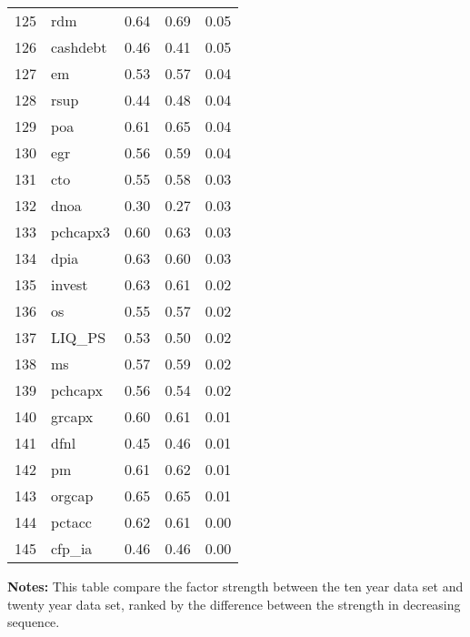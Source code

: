 \documentclass[12pt]{article}
\begin{document}
\begin{footnotesize}
\begin{longtable}{rl|c|c|c}
  125 & rdm & 0.64 & 0.69 & 0.05 \\ 
  126 & cashdebt & 0.46 & 0.41 & 0.05 \\ 
  127 & em & 0.53 & 0.57 & 0.04 \\ 
  128 & rsup & 0.44 & 0.48 & 0.04 \\ 
  129 & poa & 0.61 & 0.65 & 0.04 \\ 
  130 & egr & 0.56 & 0.59 & 0.04 \\ 
  131 & cto & 0.55 & 0.58 & 0.03 \\ 
  132 & dnoa & 0.30 & 0.27 & 0.03 \\ 
  133 & pchcapx3 & 0.60 & 0.63 & 0.03 \\ 
  134 & dpia & 0.63 & 0.60 & 0.03 \\ 
  135 & invest & 0.63 & 0.61 & 0.02 \\ 
  136 & os & 0.55 & 0.57 & 0.02 \\ 
  137 & LIQ\_PS & 0.53 & 0.50 & 0.02 \\ 
  138 & ms & 0.57 & 0.59 & 0.02 \\ 
  139 & pchcapx & 0.56 & 0.54 & 0.02 \\ 
  140 & grcapx & 0.60 & 0.61 & 0.01 \\ 
  141 & dfnl & 0.45 & 0.46 & 0.01 \\ 
  142 & pm & 0.61 & 0.62 & 0.01 \\ 
  143 & orgcap & 0.65 & 0.65 & 0.01 \\ 
  144 & pctacc & 0.62 & 0.61 & 0.00 \\ 
  145 & cfp\_ia & 0.46 & 0.46 & 0.00 \\ 
   \hline
		
	\end{longtable}
{\bf Notes:}
This table compare the factor strength between the ten year data set and twenty year data set, ranked by the difference between the strength in decreasing sequence.
\end{footnotesize}


\newpage
\end{document}
